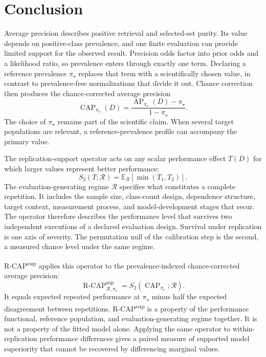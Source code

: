 \documentclass[11pt]{article}
\newcommand{\AP}{\operatorname{AP}}
\newcommand{\CAP}{\operatorname{CAP}}
\newcommand{\Regime}{\mathcal{R}}
\newcommand{\Tpi}{\CAP_{\pi_\star}}
\newcommand{\E}{\mathbb{E}}
\newcommand{\RCAPfull}{\operatorname{R\text{-}CAP}^{\mathrm{sup}}_{\Regime,\pi_\star}}
\theoremstyle{remark}
\begin{document}
\section{Conclusion}

Average precision describes positive retrieval and selected-set purity. Its value depends on positive-class prevalence, and one finite evaluation can provide limited support for the observed result. Precision odds factor into prior odds and a likelihood ratio, so prevalence enters through exactly one term. Declaring a reference prevalence $\pi_\star$ replaces that term with a scientifically chosen value, in contrast to prevalence-free normalizations that divide it out. Chance correction then produces the chance-corrected average precision
\[
\Tpi(D)
=
\frac{\AP_{\pi_\star}(D)-\pi_\star}{1-\pi_\star}.
\]
The choice of $\pi_\star$ remains part of the scientific claim. When several target populations are relevant, a reference-prevalence profile can accompany the primary value.

The replication-support operator acts on any scalar performance effect $T(D)$ for which larger values represent better performance:
\[
S_2(T;\Regime)
=
\E_{\Regime}
\left[
\min(T_1,T_2)
\right].
\]
The evaluation-generating regime $\Regime$ specifies what constitutes a complete repetition. It includes the sample size, class-count design, dependence structure, target context, measurement process, and model-development stages that recur. The operator therefore describes the performance level that survives two independent executions of a declared evaluation design. Survival under replication is one axis of severity. The permutation null of the calibration step is the second, a measured chance level under the same regime.

R-CAP\textsuperscript{sup} applies this operator to the prevalence-indexed chance-corrected average precision:
\begin{equation}
\RCAPfull
=
S_2(\CAP_{\pi_\star};\Regime).
\label{eq:conclusion-rcap-operator}
\end{equation}
It equals expected repeated performance at $\pi_\star$ minus half the expected disagreement between repetitions. R-CAP\textsuperscript{sup} is a property of the performance functional, reference population, and evaluation-generating regime together. It is not a property of the fitted model alone. Applying the same operator to within-replication performance differences gives a paired measure of supported model superiority that cannot be recovered by differencing marginal values.
\end{document}
